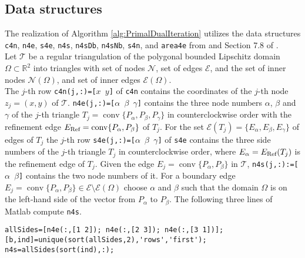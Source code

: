 \subsection{Data structures }
The realization of Algorithm \ref{alg:PrimalDualIteration} utilizes the data
structures \texttt{c4n}, 
\texttt{n4e}, \texttt{s4e}, \texttt{n4s}, \texttt{n4sDb}, \texttt{n4sNb}, \texttt{s4n},
and \texttt{area4e}
from \cite{Carstensen2017script} and Section 7.8 of \cite{CarstensenBrennerFEM}.\\
Let $\mathcal{T}$ be a regular triangulation of the polygonal bounded
Lipschitz domain $\Omega\subset \mathbb R^2$ into triangles with set of nodes
$\mathcal{N}$,
set of edges
$\mathcal{E}$, and the set of inner nodes $\mathcal{N}(\Omega)$, and set of
inner edges
$\mathcal{E}(\Omega)$. \\
The $j$-th row \texttt{c4n(j,:)=[$x$ $y$]} of \texttt{c4n} contains the
coordinates of the $j$-th 
node $z_j=(x,y)$  
of $\mathcal T$.
\texttt{n4e(j,:)=[$\alpha$ $\beta$ $\gamma$]} contains
the three node numbers $\alpha$, $\beta$ and $\gamma$ of the $j$-th triangle 
$T_j=\operatorname{conv}\{P_\alpha,P_\beta,P_\gamma\}$
in counterclockwise order with the refinement edge
$E_\textup{Ref}=\operatorname{conv}
\{P_\alpha,P_\beta\}$
of
$T_j$.
For the set
$\mathcal E(T_j) = \{ E_\alpha,E_\beta,E_\gamma\}$
of edges of $T_j$ the $j$-th row 
\texttt{s4e(j,:)=[$\alpha$ $\beta$ $\gamma$]} 
of \texttt{s4e}
contains
the three side numbers of the $j$-th triangle $T_j$
in counterclockwise order,
where
$E_\alpha=E_\textup{Ref}(T_j)$
is the refinement edge of
$T_j$. 
Given the edge $E_j=\operatorname{conv}\{P_\alpha,P_\beta\}$ in $\mathcal T$,
\texttt{n4s(j,:):=[$\alpha$ $\beta$]} contains
the two node numbers of it.
For a boundary edge
\(E_j = \operatorname*{conv} \{ P_\alpha, P_\beta \}\in\mathcal{E}\setminus\mathcal{E}(\Omega)\)
choose $\alpha$ and $\beta$ such that the domain \(\Omega\) is on the left-hand side
of the vector from \(P_\alpha\) to \(P_\beta\).
The following three lines of Matlab compute \texttt{n4s}.
\begin{lstlisting}[frame=single,numbers=none]
allSides=[n4e(:,[1 2]); n4e(:,[2 3]); n4e(:,[3 1])];
[b,ind]=unique(sort(allSides,2),'rows','first');
n4s=allSides(sort(ind),:);
\end{lstlisting}
%
